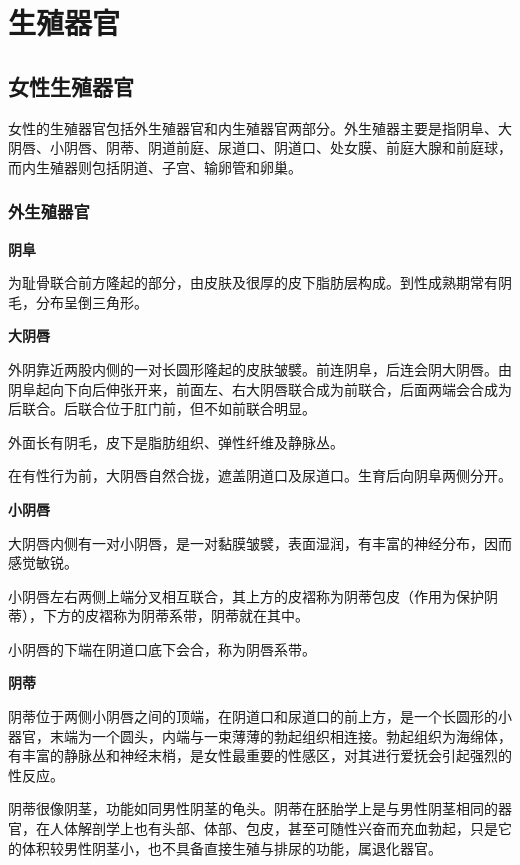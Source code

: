 \documentclass[12pt,UTF8]{ctexbook}
\begin{document}
\mainmatter

\part{生殖器官}

\chapter{女性生殖器官}

女性的生殖器官包括外生殖器官和内生殖器官两部分。外生殖器主要是指阴阜、大阴唇、小阴唇、阴蒂、阴道前庭、尿道口、阴道口、处女膜、前庭大腺和前庭球，而内生殖器则包括阴道、子宫、输卵管和卵巢。

\section{外生殖器官}

\textbf{阴阜}

为耻骨联合前方隆起的部分，由皮肤及很厚的皮下脂肪层构成。到性成熟期常有阴毛，分布呈倒三角形。

\textbf{大阴唇}

外阴靠近两股内侧的一对长圆形隆起的皮肤皱襞。前连阴阜，后连会阴大阴唇。由阴阜起向下向后伸张开来，前面左、右大阴唇联合成为前联合，后面两端会合成为后联合。后联合位于肛门前，但不如前联合明显。

外面长有阴毛，皮下是脂肪组织、弹性纤维及静脉丛。

在有性行为前，大阴唇自然合拢，遮盖阴道口及尿道口。生育后向阴阜两侧分开。

\textbf{小阴唇}

大阴唇内侧有一对小阴唇，是一对黏膜皱襞，表面湿润，有丰富的神经分布，因而感觉敏锐。

小阴唇左右两侧上端分叉相互联合，其上方的皮褶称为阴蒂包皮（作用为保护阴蒂），下方的皮褶称为阴蒂系带，阴蒂就在其中。

小阴唇的下端在阴道口底下会合，称为阴唇系带。

\textbf{阴蒂}

阴蒂位于两侧小阴唇之间的顶端，在阴道口和尿道口的前上方，是一个长圆形的小器官，末端为一个圆头，内端与一束薄薄的勃起组织相连接。勃起组织为海绵体，有丰富的静脉丛和神经末梢，是女性最重要的性感区，对其进行爱抚会引起强烈的性反应。

阴蒂很像阴茎，功能如同男性阴茎的龟头。阴蒂在胚胎学上是与男性阴茎相同的器官，在人体解剖学上也有头部、体部、包皮，甚至可随性兴奋而充血勃起，只是它的体积较男性阴茎小，也不具备直接生殖与排尿的功能，属退化器官。
\end{document}
